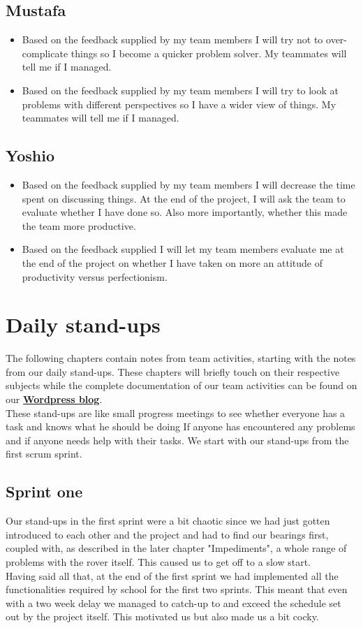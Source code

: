 \documentclass[12pt]{article}
\begin{document}
	\subsection{Mustafa}
	\begin{itemize}
		\item Based on the feedback supplied by my team members I will try not to over-complicate things so I become a quicker problem solver. My teammates will tell me if I managed.
		\item Based on the feedback supplied by my team members I will try to look at problems with different perspectives so I have a wider view of things. My teammates will tell me if I managed.
	\end{itemize}
	\subsection{Yoshio}
	\begin{itemize}
		\item Based on the feedback supplied by my team members I will decrease the time spent on discussing things. At the end of the project, I will ask the team to evaluate whether I have done so. Also more importantly, whether this made the team more productive.
		\item Based on the feedback supplied I will let my team members evaluate me at the end of the project on whether I have taken on more an attitude of productivity versus perfectionism.
	\end{itemize}
	\newpage
	\section{Daily stand-ups}
	The following chapters contain notes from team activities, starting with the notes from our daily stand-ups. These chapters will briefly touch on their respective subjects while the complete documentation of our team activities can be found on our \href{https://metabotsrow.wordpress.com/}{\textbf{Wordpress blog}}.\\
	These stand-ups are like small progress meetings to see whether everyone has a task and knows what he should be doing If anyone has encountered any problems and if anyone needs help with their tasks. We start with our stand-ups from the first scrum sprint.
	\subsection{Sprint one}
	Our stand-ups in the first sprint were a bit chaotic since we had just gotten introduced to each other and the project and had to find our bearings first, coupled with, as described in the later chapter "Impediments", a whole range of problems with the rover itself. This caused us to get off to a slow start.\\
	Having said all that, at the end of the first sprint we had implemented all the functionalities required by school for the first two sprints. This meant that even with a two week delay we managed to catch-up to and exceed the schedule set out by the project itself. This motivated us but also made us a bit cocky.
\end{document}
